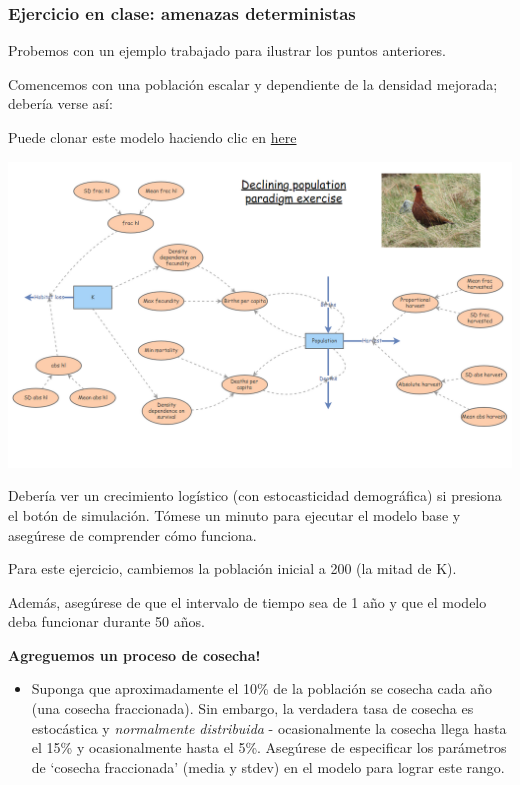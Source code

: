 \documentclass[
]{article}
\providecommand{\tightlist}{%
  \setlength{\itemsep}{0pt}\setlength{\parskip}{0pt}}
\begin{document}
\hypertarget{ejercicio-en-clase-amenazas-deterministas}{%
\subsubsection{Ejercicio en clase: amenazas
deterministas}\label{ejercicio-en-clase-amenazas-deterministas}}

Probemos con un ejemplo trabajado para ilustrar los puntos anteriores.

Comencemos con una población escalar y dependiente de la densidad
mejorada; debería verse así:

Puede clonar este modelo haciendo clic en
\href{https://insightmaker.com/insight/74417/declining-population-paradigm}{here}

\includegraphics{figures/IM5.PNG}

Debería ver un crecimiento logístico (con estocasticidad demográfica) si
presiona el botón de simulación. Tómese un minuto para ejecutar el
modelo base y asegúrese de comprender cómo funciona.

Para este ejercicio, cambiemos la población inicial a 200 (la mitad de
K).

Además, asegúrese de que el intervalo de tiempo sea de 1 año y que el
modelo deba funcionar durante 50 años.

\textbf{Agreguemos un proceso de cosecha!}

\begin{itemize}
\tightlist
\item
  Suponga que aproximadamente el 10\% de la población se cosecha cada
  año (una cosecha fraccionada). Sin embargo, la verdadera tasa de
  cosecha es estocástica y \emph{normalmente distribuida} -
  ocasionalmente la cosecha llega hasta el 15\% y ocasionalmente hasta
  el 5\%. Asegúrese de especificar los parámetros de `cosecha
  fraccionada' (media y stdev) en el modelo para lograr este rango.
\end{itemize}
\end{document}
